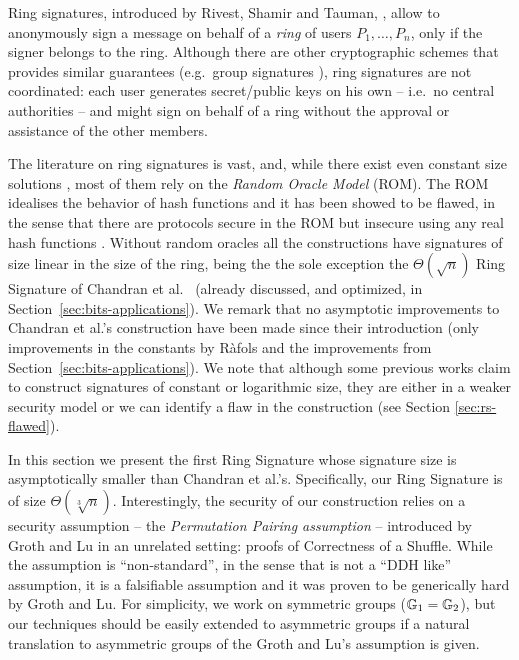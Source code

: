 Ring signatures, introduced by Rivest, Shamir and Tauman, \cite{AC:RivShaTau01}, allow to anonymously sign a message on behalf of a \emph{ring} of users $P_1,\ldots,P_n$, only if the signer belongs to the ring. Although there are other cryptographic schemes that provides similar guarantees (e.g.~group signatures \cite{EC:ChaVan91}), ring signatures are not coordinated: each user generates secret/public keys on his own -- i.e.~no central authorities -- and might sign on behalf of a ring without the approval or assistance of the other members.


The literature on ring signatures is vast, and, while there exist even constant size solutions \cite{EC:DKNS04}, most of them rely on the \emph{Random Oracle Model} (ROM). The ROM idealises the behavior of hash functions and it has been showed to be flawed, in the sense that there are protocols secure in the ROM but insecure using any real hash functions \cite{STOC:CanGolHal98}. Without random oracles all the constructions have signatures of size linear in the size of the ring, being the the sole exception the $\Theta(\sqrt{n})$ Ring Signature of Chandran et al.~\cite{ICALP:ChaGroSah07} (already discussed, and optimized, in Section~\ref{sec:bits-applications}). 
We remark that no asymptotic improvements to Chandran et al.'s construction have been made since their introduction (only improvements in the constants by R\`afols \cite{TCC:Rafols15} and the improvements from Section~\ref{sec:bits-applications}). We note that although some previous works claim to construct signatures of constant \cite{ACISP:BosDasRan15} or logarithmic \cite{IET:GriSusPla16} size, they are either in a weaker security model or we can identify a flaw in the construction (see Section \ref{sec:rs-flawed}). 


In this section we present the first Ring Signature whose signature size is asymptotically smaller than Chandran et al.'s. Specifically, our Ring Signature is of size $\Theta(\sqrt[3]{n})$. Interestingly, the security of our construction relies on a security assumption -- the \emph{Permutation Pairing assumption} -- introduced by Groth and Lu \cite{AC:GroLu07} in an unrelated setting: proofs of Correctness of a Shuffle. While the assumption is ``non-standard'', in the sense that is not a ``DDH like'' assumption, it is a falsifiable assumption and it was proven to be generically hard by Groth and Lu. For simplicity, we work on symmetric groups ($\mathbb{G}_1=\mathbb{G}_2$), but our techniques should be easily extended to asymmetric groups if a natural translation to asymmetric groups of the Groth and Lu's assumption is given.

